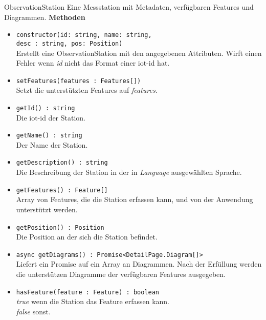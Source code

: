     \begin{Class}{ObservationStation}
        Eine Messstation mit Metadaten, verfügbaren Features und Diagrammen.
        \textbf{Methoden}
        \begin{itemize}
            \item \texttt{constructor(id: string, name: string,
            \\ desc : string, pos: Position)}
            \\ Erstellt eine ObservationStation mit den angegebenen Attributen.
            Wirft einen Fehler wenn \emph{id} nicht das Format einer iot-id hat.
            \item \texttt{setFeatures(features : Features[])}
            \\ Setzt die unterstützten Features auf \emph{features}.
            \item \texttt{getId() : string}
            \\ Die iot-id der Station.
            \item \texttt{getName() : string}
            \\ Der Name der Station.
            \item \texttt{getDescription() : string}
            \\ Die Beschreibung der Station in der in \emph{Language} ausgewählten Sprache.
            \item \texttt{getFeatures() : Feature[]}
            \\ Array von Features, die die Station erfassen kann, und von der Anwendung unterstützt werden.
            \item \texttt{getPosition() : Position}
            \\ Die Position an der sich die Station befindet.
            \item \texttt{async getDiagrams() : Promise<DetailPage.Diagram[]>}
            \\ Liefert ein Promise auf ein Array an Diagrammen.
            Nach der Erfüllung werden die unterstützen Diagramme der verfügbaren Features ausgegeben.
            \item \texttt{hasFeature(feature : Feature) : boolean}
            \\ \emph{true} wenn die Station das Feature erfassen kann.
            \\ \emph{false} sonst.
        \end{itemize}
    \end{Class}


